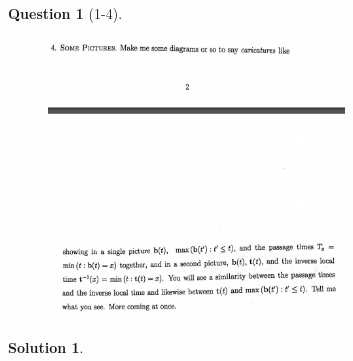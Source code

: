 \documentclass[11pt]{article}
\theoremstyle{plain}
\theoremstyle{quest}
\newtheorem*{question}{Question}
\newtheorem*{solution}{Solution}
\begin{document}
\begin{question}[1-4]
\hfill
\begin{figure}[h!]
  \centering
    \includegraphics[width=0.7\textwidth]{limthm2-f-p4.png}
\end{figure}
\end{question}
\begin{solution} \hfill \\

\end{solution}

\newpage
\end{document}
